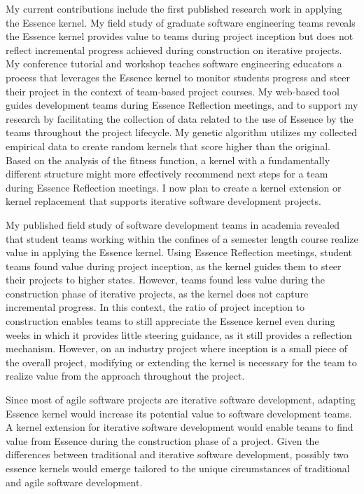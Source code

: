 \documentclass[preprint,12pt,3p]{elsarticle}
\begin{document}
My current contributions include the first published research work in applying the Essence kernel. My field study of graduate software engineering teams reveals the Essence kernel provides value to teams during project inception but does not reflect incremental progress achieved during construction on iterative projects. My conference tutorial and workshop teaches software engineering educators a process that leverages the Essence kernel to monitor students progress and steer their project in the context of team-based project courses. My web-based tool guides development teams during Essence Reflection meetings, and to support my research by facilitating the collection of data related to the use of Essence by the teams throughout the project lifecycle. My genetic algorithm utilizes my collected empirical data to create random kernels that score higher than the original. Based on the analysis of the fitness function, a kernel with a fundamentally different structure might more effectively recommend next steps for a team during Essence Reflection meetings. I now plan to create a kernel extension or kernel replacement that supports iterative software development projects.

My published field study of software development teams in academia revealed that student teams working within the confines of a semester length course realize value in applying the Essence kernel. Using Essence Reflection meetings, student teams found value during project inception, as the kernel guides them to steer their projects to higher states. However, teams found less value during the construction phase of iterative  projects, as the kernel does not capture incremental progress. In this context, the ratio of project inception to construction enables teams to still appreciate the Essence kernel even during weeks in which it provides little steering guidance, as it still provides a reflection mechanism. However, on an industry project where inception is a small piece of the overall project, modifying or extending the kernel is necessary for the team to realize value from the approach throughout the project.

Since most of agile software projects are iterative software development, adapting Essence kernel would increase its potential value to software development teams. A kernel extension for iterative software development would enable teams to find value from Essence during the construction phase of a project. Given the differences between traditional and iterative software development, possibly two essence kernels would emerge tailored to the unique circumstances of traditional and agile software development.
\end{document}
